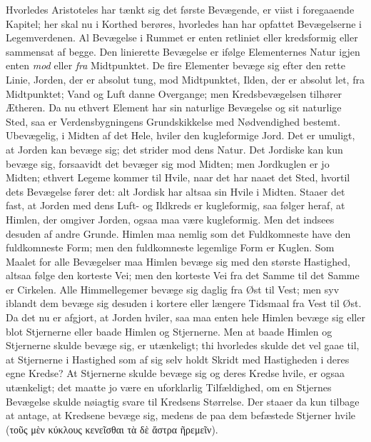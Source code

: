 \documentclass[12pt,a4paper]{book}
\begin{document}
Hvorledes Aristoteles har tænkt sig det første Bevægende, er viist i
foregaaende Kapitel; her skal nu i Korthed berøres, hvorledes han har
opfattet Bevægelserne i Legemverdenen. Al Bevægelse i Rummet er enten
retliniet eller kredsformig eller sammensat af begge. Den linierette
Bevægelse er ifølge Elementernes Natur igjen enten \emph{mod} eller
\emph{fra} Midtpunktet.
De fire Elementer bevæge sig efter den rette Linie, Jorden, der er
absolut tung, mod Midtpunktet, Ilden, der er absolut let, fra
Midtpunktet; Vand og Luft danne Overgange; men Kredsbevægelsen tilhører
Ætheren. Da nu ethvert Element har sin naturlige Bevægelse og sit
naturlige Sted, saa er Verdensbygningens Grundskikkelse med
Nødvendighed bestemt. Ubevægelig, i Midten af det Hele, hviler den
kugleformige Jord. Det er umuligt, at Jorden kan bevæge sig; det
strider mod dens Natur. Det Jordiske kan kun bevæge sig, forsaavidt det
bevæger sig mod Midten; men Jordkuglen er jo Midten; ethvert Legeme
kommer til Hvile, naar det har naaet det Sted, hvortil dets Bevægelse
fører det: alt Jordisk har altsaa sin Hvile i Midten. Staaer det fast,
at Jorden med dens Luft- og Ildkreds er kugleformig, saa følger heraf,
at Himlen, der omgiver Jorden, ogsaa maa være kugleformig.
Men det indsees desuden af andre Grunde. Himlen maa nemlig som det
Fuldkomneste have den fuldkomneste Form; men den fuldkomneste legemlige
Form er Kuglen. Som Maalet for alle Bevægelser maa Himlen bevæge sig
med den største Hastighed, altsaa følge den korteste Vei; men den
korteste Vei fra det Samme til det Samme er Cirkelen. Alle
Himmellegemer bevæge sig daglig fra Øst til Vest; men syv iblandt dem
bevæge sig desuden i kortere eller længere Tidsmaal fra Vest til Øst.
Da det nu er afgjort, at Jorden hviler, saa maa enten hele Himlen
bevæge sig eller blot Stjernerne eller baade Himlen og Stjernerne. Men
at baade Himlen og Stjernerne skulde bevæge sig, er utænkeligt; thi
hvorledes skulde det vel gaae til, at Stjernerne i Hastighed som af sig
selv holdt Skridt med Hastigheden i deres egne Kredse? At Stjernerne
skulde bevæge sig og deres Kredse hvile, er ogsaa utænkeligt; det
maatte jo være en uforklarlig Tilfældighed, om en Stjernes Bevægelse
skulde nøiagtig svare til Kredsens Størrelse. Der staaer da kun tilbage
at antage, at Kredsene bevæge sig, medens de paa dem befæstede Stjerner
hvile (τοῦς μὲν κύκλους κενεῖσθαι τὰ δὲ ἄστρα ῆρεμεῖν).
\end{document}
